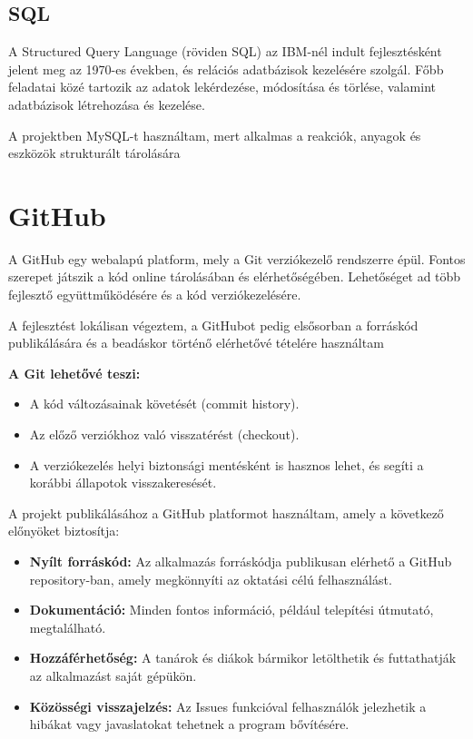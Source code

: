\documentclass[]{thesis-ekf}
\begin{document}
	\subsection{SQL}
	
	A Structured Query Language (röviden SQL\cite{SQL}) az IBM-nél indult fejlesztésként jelent meg az 1970-es években, és relációs adatbázisok kezelésére szolgál. Főbb feladatai közé tartozik az adatok lekérdezése, módosítása és törlése, valamint adatbázisok létrehozása és kezelése.
	
	
	A projektben MySQL-t használtam, mert alkalmas a reakciók, anyagok és eszközök strukturált tárolására
	
	\section{GitHub}
	
	A GitHub\cite{GitHub} egy webalapú platform, mely a Git\cite{Git} verziókezelő rendszerre épül. Fontos szerepet játszik a kód online tárolásában és elérhetőségében. Lehetőséget ad több fejlesztő együttműködésére és a kód verziókezelésére.
	
	A fejlesztést lokálisan végeztem, a GitHubot pedig elsősorban a forráskód publikálására és a beadáskor történő elérhetővé tételére használtam
	
	\textbf{A Git lehetővé teszi:}
	\begin{itemize}
		\item A kód változásainak követését (commit history).
		\item Az előző verziókhoz való visszatérést (checkout).
		\item A verziókezelés helyi biztonsági mentésként is hasznos lehet, és segíti a korábbi állapotok visszakeresését.
		
	\end{itemize}
	
	A projekt publikálásához a GitHub platformot használtam, amely a következő előnyöket biztosítja:
	\begin{itemize}
		\item \textbf{Nyílt forráskód:} Az alkalmazás forráskódja publikusan elérhető a GitHub repository-ban, amely megkönnyíti az oktatási célú felhasználást.
		\item \textbf{Dokumentáció:} Minden fontos információ, például telepítési útmutató, megtalálható.
		\item \textbf{Hozzáférhetőség:} A tanárok és diákok bármikor letölthetik és futtathatják az alkalmazást saját gépükön.
		\item \textbf{Közösségi visszajelzés:} Az Issues funkcióval felhasználók jelezhetik a hibákat vagy javaslatokat tehetnek a program bővítésére.
	\end{itemize}
	
\end{document}

